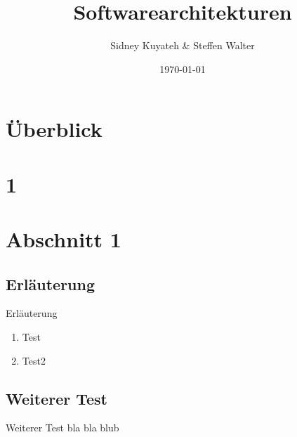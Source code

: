 \documentclass{beamer}
\title{Softwarearchitekturen}
\author{Sidney Kuyateh \& Steffen Walter}
\institute{Duale Hochschule Baden-Württemberg}
\date{\today}
\begin{document}
	\maketitle
	\frame{\tableofcontents}
	\section{Überblick}
	\section{1}	
	
	\section{Abschnitt 1}
		\subsection{Erläuterung}
			\begin{frame}{Erläuterung}
				\begin{enumerate}
					\item Test
					\item Test2
				\end{enumerate}
			\end{frame}
		\subsection{Weiterer Test}
			\begin{frame}{Weiterer Test}
				bla bla blub
			\end{frame}
\end{document}
